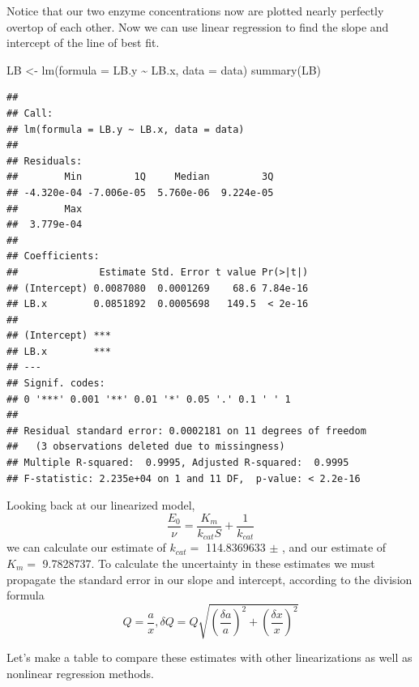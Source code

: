 \documentclass[
]{article}
\newenvironment{Shaded}{\begin{snugshade}}{\end{snugshade}}
\newcommand{\AttributeTok}[1]{\textcolor[rgb]{0.77,0.63,0.00}{#1}}
\newcommand{\FunctionTok}[1]{\textcolor[rgb]{0.00,0.00,0.00}{#1}}
\newcommand{\NormalTok}[1]{#1}
\newcommand{\OtherTok}[1]{\textcolor[rgb]{0.56,0.35,0.01}{#1}}
\newcommand{\SpecialCharTok}[1]{\textcolor[rgb]{0.00,0.00,0.00}{#1}}
\begin{document}
Notice that our two enzyme concentrations now are plotted nearly perfectly overtop of each other. Now we can use linear regression to find the slope and intercept of the line of best fit.

\begin{Shaded}
\begin{Highlighting}[]
\NormalTok{LB }\OtherTok{\textless{}{-}} \FunctionTok{lm}\NormalTok{(}\AttributeTok{formula =}\NormalTok{ LB.y }\SpecialCharTok{\textasciitilde{}}\NormalTok{ LB.x, }\AttributeTok{data =}\NormalTok{ data)}
\FunctionTok{summary}\NormalTok{(LB)}
\end{Highlighting}
\end{Shaded}

\begin{verbatim}
## 
## Call:
## lm(formula = LB.y ~ LB.x, data = data)
## 
## Residuals:
##        Min         1Q     Median         3Q 
## -4.320e-04 -7.006e-05  5.760e-06  9.224e-05 
##        Max 
##  3.779e-04 
## 
## Coefficients:
##              Estimate Std. Error t value Pr(>|t|)
## (Intercept) 0.0087080  0.0001269    68.6 7.84e-16
## LB.x        0.0851892  0.0005698   149.5  < 2e-16
##                
## (Intercept) ***
## LB.x        ***
## ---
## Signif. codes:  
## 0 '***' 0.001 '**' 0.01 '*' 0.05 '.' 0.1 ' ' 1
## 
## Residual standard error: 0.0002181 on 11 degrees of freedom
##   (3 observations deleted due to missingness)
## Multiple R-squared:  0.9995, Adjusted R-squared:  0.9995 
## F-statistic: 2.235e+04 on 1 and 11 DF,  p-value: < 2.2e-16
\end{verbatim}

Looking back at our linearized model,
\[\frac{E_0}{\nu} = \frac{K_m}{k_{cat}S} + \frac{1}{k_{cat}}\]
we can calculate our estimate of \(k_{cat}=\) 114.8369633 \(\pm\) , and our estimate of \(K_m =\) 9.7828737. To calculate the uncertainty in these estimates we must propagate the standard error in our slope and intercept, according to the division formula
\[Q = \frac{a}{x}, \delta Q = Q \sqrt{(\frac{\delta a}{a})^2 + (\frac{\delta x}{x})^2}\]

Let's make a table to compare these estimates with other linearizations as well as nonlinear regression methods.
\end{document}
